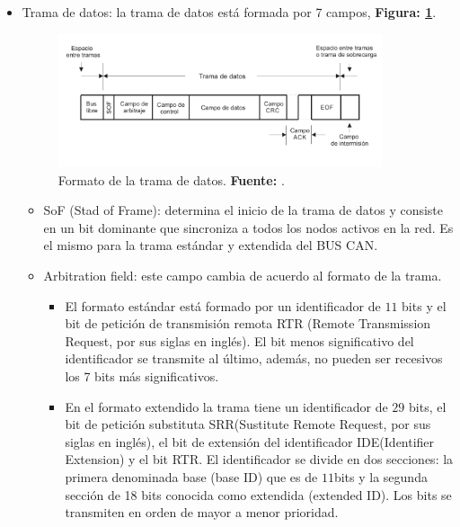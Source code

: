 \begin{itemize} %
\item Trama de datos:  la trama de datos está formada por 7 campos, \textbf{Figura: \ref{TRD}}.

			\begin{figure}[H]
			\centering
				\includegraphics[width=0.9\textwidth]{./Cap2imagen/trama_datos.pdf}
			\caption[Formato de la trama de datos.]{Formato de la trama de datos.\textbf{ Fuente:} \cite{PSMR}.}
			\label{TRD} 
			\end{figure}

				\begin{itemize} %
				\item SoF (Stad of Frame): determina el inicio de la trama de datos y consiste en un bit dominante que sincroniza a todos los nodos activos en la red. Es el mismo para la trama estándar y extendida del BUS CAN.
				\item Arbitration field: este campo cambia de acuerdo al formato de la trama.
										
											\begin {itemize} %
											\item El formato estándar está formado por un identificador de $11$ bits  y el bit de petición de transmisión remota RTR (Remote Transmission Request, por sus siglas en inglés). El bit menos significativo del identificador se transmite al último, además, no pueden ser recesivos los 7 bits más significativos.
											\item En el formato extendido la trama tiene un identificador de $29$ bits, el bit de petición substituta SRR(Sustitute Remote Request, por sus siglas en inglés), el bit de extensión del identificador IDE(Identifier Extension) y el bit RTR. El identificador se divide en dos secciones: la primera denominada base (base ID) que es de $11$bits y la segunda sección de 18 bits conocida como extendida (extended ID). Los bits se transmiten en orden de mayor a menor prioridad.
											\end {itemize} %


\end{itemize}
\end{itemize}
